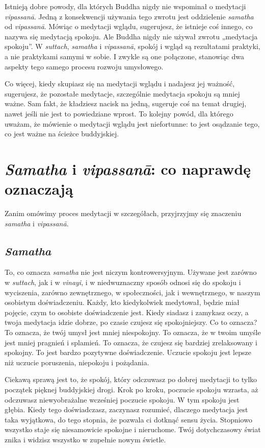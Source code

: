 \documentclass[12pt,openany]{book}
\begin{document}
Istnieją dobre powody, dla których Buddha nigdy nie wspominał o medytacji \textit{vipassanā}. Jedną z konsekwencji używania tego zwrotu jest oddzielenie \textit{samatha} od \textit{vipassanā}. Mówiąc o medytacji wglądu, sugerujesz, że istnieje coś innego, co nazywa się medytacją spokoju. Ale Buddha nigdy nie używał zwrotu „medytacja spokoju”. W \textit{suttach}, \textit{samatha} i \textit{vipassanā}, spokój i wgląd są rezultatami praktyki, a nie praktykami samymi w sobie. I zwykle są one połączone, stanowiąc dwa aspekty tego samego procesu rozwoju umysłowego.

Co więcej, kiedy skupiasz się na medytacji wglądu i nadajesz jej ważność, sugerujesz, że pozostałe medytacje, szczególnie medytacja spokoju są mniej ważne. Sam fakt, że kładziesz nacisk na jedną, sugeruje coś na temat drugiej, nawet jeśli nie jest to powiedziane wprost. To kolejny powód, dla którego uważam, że mówienie o medytacji wglądu jest niefortunne: to jest osądzanie tego, co jest ważne na ścieżce buddyjskiej.


\chapter*{\textit{Samatha} i \textit{vipassanā}: co naprawdę oznaczają}

Zanim omówimy proces medytacji w szczegółach, przyjrzyjmy się znaczeniu  \textit{samatha} i \textit{vipassanā}.

\section*{\textit{Samatha}}

To, co oznacza \textit{samatha} nie jest niczym kontrowersyjnym. Używane jest zarówno w \textit{suttach}, jak i w \textit{vinayi}, i w niedwuznaczny sposób odnosi się do spokoju i wyciszenia, zarówno zewnętrznego, w społeczności, jak i wewnętrznego, w naszym osobistym doświadczeniu. Każdy, kto kiedykolwiek medytował, będzie miał pojęcie, czym to osobiste doświadczenie jest. Kiedy siadasz i zamykasz oczy, a twoja medytacja idzie dobrze, po czasie czujesz się spokojniejszy. Co to oznacza? To oznacza, że twój umysł jest mniej niespokojny. To oznacza, że w twoim umyśle jest mniej pragnień i splamień. To oznacza, że czujesz się bardziej zrelaksowany i spokojny. To jest bardzo pozytywne doświadczenie. Uczucie spokoju jest lepsze niż uczucie poruszenia, niepokoju i pożądania.

Ciekawą sprawą jest to, że spokój, który odczuwasz po dobrej medytacji to tylko początek pięknej buddyjskiej drogi. Krok po kroku, poczucie spokoju wzrasta, aż odczuwasz niewyobrażalne wcześniej poczucie spokoju. W tym spokoju jest głębia. Kiedy tego doświadczasz, zaczynasz rozumieć, dlaczego medytacja jest taka wyjątkowa, do tego stopnia, że pozwala ci dotknąć sensu życia. Stopniowo wszystko staje się niesamowicie spokojne i nieruchome. Twój dotychczasowy świat znika i widzisz wszystko w zupełnie nowym świetle.
\end{document}
